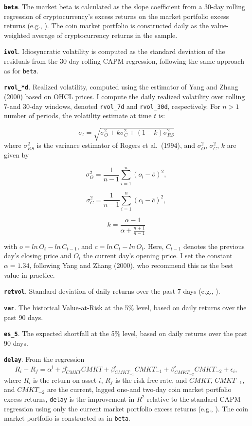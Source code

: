 \documentclass[
  12pt,
  a4paper,
  openany]{scrbook}
\begin{document}
\textbf{\texttt{beta}}. The market beta is calculated as the slope
coefficient from a 30-day rolling regression of cryptocurrency's excess
returns on the market portfolio excess returns (e.g.,
).
The coin market portfolio is constructed daily as the value-weighted
average of cryptocurrency returns in the sample.

\textbf{\texttt{ivol}}. Idiosyncratic volatility is computed as the
standard deviation of the residuals from the 30-day rolling CAPM
regression, following the same approach as for \texttt{beta}.

\textbf{\texttt{rvol\_*d}}. Realized volatility, computed using the
estimator of Yang and Zhang (2000) based on OHCL prices. I compute the
daily realized volatility over rolling 7-and 30-day windows, denoted
\texttt{rvol\_7d} and \texttt{rvol\_30d}, respectively. For \(n > 1\)
number of periods, the volatility estimate at time \(t\) is:

\[
\sigma_t = \sqrt{\sigma^2_O + k\sigma^2_C + (1 - k)\sigma^2_{RS}}
\] where \(\sigma^2_{RS}\) is the variance estimator of Rogers et
al.~(1994), and \(\sigma^2_O\), \(\sigma^2_C\), \(k\) are given by

\[
\sigma^2_O = \frac{1}{n-1}\sum\limits_{i=1}^n(o_i - \bar o)^2,
\]

\[
\sigma^2_C = \frac{1}{n-1}\sum\limits_{i=1}^n(c_i - \bar c)^2,
\]

\[
k = \frac{\alpha -1}{\alpha + \frac{n+1}{n-1}}
\]

with \(o = ln\,O_t - ln\,C_{t-1}\), and \(c = ln\,C_t - ln\,O_t\). Here,
\(C_{t-1}\) denotes the previous day's closing price and \(O_t\) the
current day's opening price. I set the constant \(\alpha = 1.34\),
following Yang and Zhang (2000), who recommend this as the best value in
practice.

\textbf{\texttt{retvol}}. Standard deviation of daily returns over the
past 7 days (e.g., ).

\textbf{\texttt{var}}. The historical Value-at-Risk at the 5\% level,
based on daily returns over the past 90 days.

\textbf{\texttt{es\_5}}. The expected shortfall at the 5\% level, based
on daily returns over the past 90 days.

\textbf{\texttt{delay}}. From the regression \[
R_i - R_f = \alpha^i + \beta^i_{CMKT}CMKT + \beta^i_{CMKT_{-1}}CMKT_{-1} + \beta^i_{CMKT_{-2}}CMKT_{-2} + \epsilon_i, 
\] where \(R_i\) is the return on asset \(i\), \(R_f\) is the risk-free
rate, and \(CMKT\), \(CMKT_{-1}\), and \(CMKT_{-2}\) are the current,
lagged one-and two-day coin market portfolio excess returns,
\texttt{delay} is the improvement in \(R^2\) relative to the standard
CAPM regression using only the current market portfolio excess returns
(e.g., ).
The coin market portfolio is constructed as in \texttt{beta}.
\end{document}
